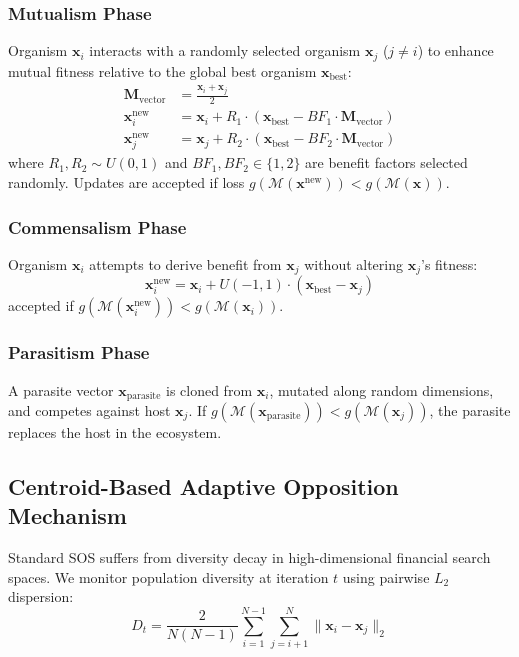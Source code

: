 \documentclass[11pt,a4paper]{article}
\begin{document}
\subsubsection{Mutualism Phase}
Organism $\mathbf{x}_i$ interacts with a randomly selected organism $\mathbf{x}_j$ ($j \neq i$) to enhance mutual fitness relative to the global best organism $\mathbf{x}_{\text{best}}$:
\begin{align}
\mathbf{M}_{\text{vector}} &= \frac{\mathbf{x}_i + \mathbf{x}_j}{2} \\
\mathbf{x}_i^{\text{new}} &= \mathbf{x}_i + R_1 \cdot (\mathbf{x}_{\text{best}} - BF_1 \cdot \mathbf{M}_{\text{vector}}) \\
\mathbf{x}_j^{\text{new}} &= \mathbf{x}_j + R_2 \cdot (\mathbf{x}_{\text{best}} - BF_2 \cdot \mathbf{M}_{\text{vector}})
\end{align}
where $R_1, R_2 \sim U(0, 1)$ and $BF_1, BF_2 \in \{1, 2\}$ are benefit factors selected randomly. Updates are accepted if loss $g(\mathcal{M}(\mathbf{x}^{\text{new}})) < g(\mathcal{M}(\mathbf{x}))$.

\subsubsection{Commensalism Phase}
Organism $\mathbf{x}_i$ attempts to derive benefit from $\mathbf{x}_j$ without altering $\mathbf{x}_j$'s fitness:
\begin{equation}
\mathbf{x}_i^{\text{new}} = \mathbf{x}_i + U(-1, 1) \cdot (\mathbf{x}_{\text{best}} - \mathbf{x}_j)
\end{equation}
accepted if $g(\mathcal{M}(\mathbf{x}_i^{\text{new}})) < g(\mathcal{M}(\mathbf{x}_i))$.

\subsubsection{Parasitism Phase}
A parasite vector $\mathbf{x}_{\text{parasite}}$ is cloned from $\mathbf{x}_i$, mutated along random dimensions, and competes against host $\mathbf{x}_j$. If $g(\mathcal{M}(\mathbf{x}_{\text{parasite}})) < g(\mathcal{M}(\mathbf{x}_j))$, the parasite replaces the host in the ecosystem.

\subsection{Centroid-Based Adaptive Opposition Mechanism}
Standard SOS suffers from diversity decay in high-dimensional financial search spaces. We monitor population diversity at iteration $t$ using pairwise $L_2$ dispersion:
\begin{equation}
D_t = \frac{2}{N(N-1)} \sum_{i=1}^{N-1} \sum_{j=i+1}^N \|\mathbf{x}_i - \mathbf{x}_j\|_2
\end{equation}
\end{document}
